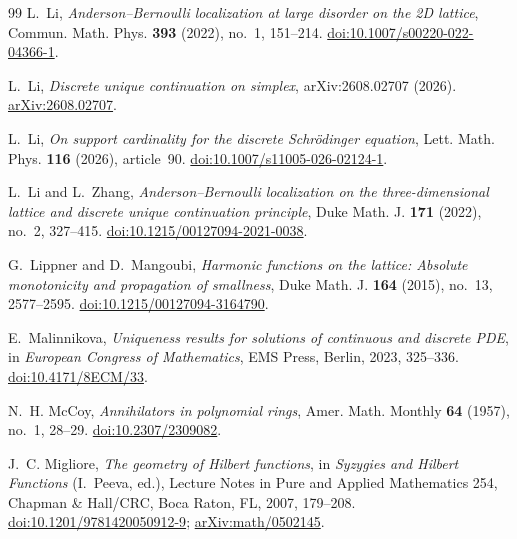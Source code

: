 \documentclass[11pt,reqno]{amsart}
\theoremstyle{definition}
\theoremstyle{plain}
\numberwithin{equation}{section}
\begin{document}
\begin{thebibliography}{99}
L.~Li,
\emph{Anderson--Bernoulli localization at large disorder on the 2D lattice},
Commun. Math. Phys. \textbf{393} (2022), no.~1, 151--214.
\href{https://doi.org/10.1007/s00220-022-04366-1}
{doi:10.1007/s00220-022-04366-1}.

L.~Li,
\emph{Discrete unique continuation on simplex},
arXiv:2608.02707 (2026).
\href{https://arxiv.org/abs/2608.02707}
{arXiv:2608.02707}.

L.~Li,
\emph{On support cardinality for the discrete Schr\"odinger equation},
Lett. Math. Phys. \textbf{116} (2026), article~90.
\href{https://doi.org/10.1007/s11005-026-02124-1}
{doi:10.1007/s11005-026-02124-1}.

L.~Li and L.~Zhang,
\emph{Anderson--Bernoulli localization on the three-dimensional lattice and
discrete unique continuation principle},
Duke Math. J. \textbf{171} (2022), no.~2, 327--415.
\href{https://doi.org/10.1215/00127094-2021-0038}
{doi:10.1215/00127094-2021-0038}.

G.~Lippner and D.~Mangoubi,
\emph{Harmonic functions on the lattice: Absolute monotonicity and
propagation of smallness},
Duke Math. J. \textbf{164} (2015), no.~13, 2577--2595.
\href{https://doi.org/10.1215/00127094-3164790}
{doi:10.1215/00127094-3164790}.

E.~Malinnikova,
\emph{Uniqueness results for solutions of continuous and discrete PDE},
in \emph{European Congress of Mathematics},
EMS Press, Berlin, 2023, 325--336.
\href{https://doi.org/10.4171/8ECM/33}
{doi:10.4171/8ECM/33}.

N.~H. McCoy,
\emph{Annihilators in polynomial rings},
Amer. Math. Monthly \textbf{64} (1957), no.~1, 28--29.
\href{https://doi.org/10.2307/2309082}
{doi:10.2307/2309082}.

J.~C. Migliore,
\emph{The geometry of Hilbert functions},
in \emph{Syzygies and Hilbert Functions} (I.~Peeva, ed.),
Lecture Notes in Pure and Applied Mathematics 254,
Chapman \& Hall/CRC, Boca Raton, FL, 2007, 179--208.
\href{https://doi.org/10.1201/9781420050912-9}
{doi:10.1201/9781420050912-9};
\href{https://arxiv.org/abs/math/0502145}
{arXiv:math/0502145}.

\end{thebibliography}
\end{document}
